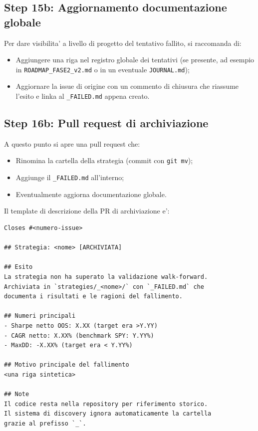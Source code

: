\subsection{Step 15b: Aggiornamento documentazione globale}

Per dare visibilita' a livello di progetto del tentativo fallito, si raccomanda di:

\begin{itemize}
  \item Aggiungere una riga nel registro globale dei tentativi (se presente, ad esempio in \texttt{ROADMAP\_FASE2\_v2.md} o in un eventuale \texttt{JOURNAL.md});
  \item Aggiornare la issue di origine con un commento di chiusura che riassume l'esito e linka al \texttt{\_FAILED.md} appena creato.
\end{itemize}

\subsection{Step 16b: Pull request di archiviazione}

A questo punto si apre una pull request che:

\begin{itemize}
  \item Rinomina la cartella della strategia (commit con \texttt{git mv});
  \item Aggiunge il \texttt{\_FAILED.md} all'interno;
  \item Eventualmente aggiorna documentazione globale.
\end{itemize}

Il template di descrizione della PR di archiviazione e':

\begin{lstlisting}
Closes #<numero-issue>

## Strategia: <nome> [ARCHIVIATA]

## Esito
La strategia non ha superato la validazione walk-forward.
Archiviata in `strategies/_<nome>/` con `_FAILED.md` che
documenta i risultati e le ragioni del fallimento.

## Numeri principali
- Sharpe netto OOS: X.XX (target era >Y.YY)
- CAGR netto: X.XX% (benchmark SPY: Y.YY%)
- MaxDD: -X.XX% (target era < Y.YY%)

## Motivo principale del fallimento
<una riga sintetica>

## Note
Il codice resta nella repository per riferimento storico.
Il sistema di discovery ignora automaticamente la cartella
grazie al prefisso `_`.
\end{lstlisting}

